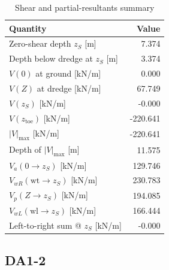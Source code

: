 \begin{table}[H]
  \centering
  \caption{Shear and partial-resultants summary}
  \label{tab:shear_summary_zs}
  \small
  \setlength{\tabcolsep}{10pt}
  \renewcommand{\arraystretch}{1.15}
  \begin{tabular}{@{}l r@{}}
    \toprule
    Quantity & Value \\
    \midrule
    Zero-shear depth $z_S$ [m] & 7.374 \\
    Depth below dredge at $z_S$ [m] & 3.374 \\
    $V(0)$ at ground [kN/m] & 0.000 \\
    $V(Z)$ at dredge [kN/m] & 67.749 \\
    $V(z_S)$ [kN/m] & -0.000 \\
    $V(z_{\text{toe}})$ [kN/m] & -220.641 \\
    $|V|_{\max}$ [kN/m] & -220.641 \\
    Depth of $|V|_{\max}$ [m] & 11.575 \\
    $V_a(0\to z_S)$ [kN/m] & 129.746 \\
    $V_{wR}(\text{wt}\to z_S)$ [kN/m] & 230.783 \\
    $V_p(Z\to z_S)$ [kN/m] & 194.085 \\
    $V_{wL}(\text{wl}\to z_S)$ [kN/m] & 166.444 \\
    Left-to-right sum @ $z_S$ [kN/m] & -0.000 \\
    \bottomrule
  \end{tabular}
\end{table}

\subsection{DA1-2}

